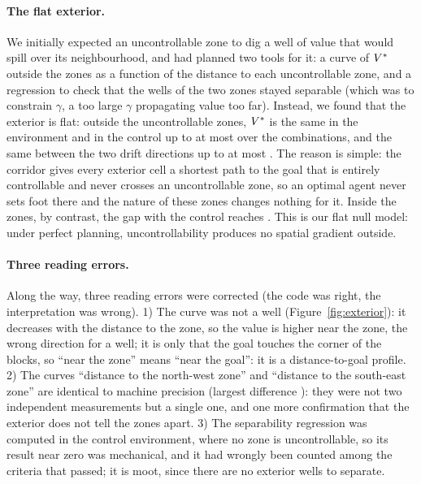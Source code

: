 \documentclass[10pt]{article}
\begin{document}
\paragraph{The flat exterior.}
We initially expected an uncontrollable zone to dig a well of value that would spill over its neighbourhood, and had
planned two tools for it: a curve of $V^{*}$ outside the zones as a function of the distance to each uncontrollable
zone, and a regression to check that the wells of the two zones stayed separable (which was to constrain $\gamma$, a
too large $\gamma$ propagating value too far).
Instead, we found that the exterior is flat: outside the uncontrollable zones, $V^{*}$ is the same in the environment
and in the control up to at most \eOneExteriorDiffCtrl{} over the \eOneCalibCombos{} combinations, and the same between
the two drift directions up to at most \eOneExteriorDiffDirection.
The reason is simple: the corridor gives every exterior cell a shortest path to the goal that is entirely controllable
and never crosses an uncontrollable zone, so an optimal agent never sets foot there and the nature of these zones changes
nothing for it.
Inside the zones, by contrast, the gap with the control reaches \eOneInteriorGapMax.
This is our flat null model: under perfect planning, uncontrollability produces no spatial gradient outside.

\paragraph{Three reading errors.}
Along the way, three reading errors were corrected (the code was right, the interpretation was wrong).
1) The curve was not a well (Figure~\ref{fig:exterior}): it decreases with the distance to the zone, so the value is %
higher near the zone, the wrong direction for a well; it is only that the goal touches the corner of the blocks, so
``near the zone'' means ``near the goal'': it is a distance-to-goal profile.
2) The curves ``distance to the north-west zone'' and ``distance to the south-east zone'' are identical to machine %
precision (largest difference \eOneProfileDiffNWSE): they were not two independent measurements but a single one, and one
more confirmation that the exterior does not tell the zones apart.
3) The separability regression was computed in the control environment, where no zone is uncontrollable, so its result %
near zero was mechanical, and it had wrongly been counted among the criteria that passed; it is moot, since there are no
exterior wells to separate.
\end{document}

